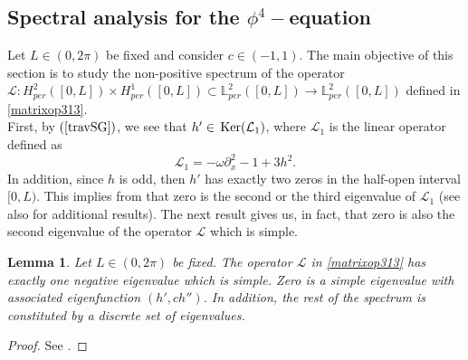 \documentclass[12pt,reqno,a4paper]{amsart} %
\newcommand{\Ker}{{\rm \,Ker}}
\numberwithin{equation}{section}
\numberwithin{figure}{section}
\newtheorem{lemma}[theorem]{Lemma}
\begin{document}
\subsection{Spectral analysis for the $\phi^4-$equation}\label{spectralKG} 

 Let $L\in (0,2\pi)$ be fixed and consider $c \in (-1,1)$. The main objective of this section is to study the non-positive spectrum of the  operator $\mathcal{L}:H^2_{per}([0,L])\times H^1_{per}([0,L]) \subset\mathbb{L}^2_{per}([0,L])\rightarrow \mathbb{L}^2_{per}([0,L])$ defined in \eqref{matrixop313}. \\
\indent First, by $(\ref{travSG})$, we see that $h' \in \Ker(\mathcal{L}_1)$, where $\mathcal{L}_1$ is the linear operator defined as
\begin{equation}\label{opL1}
\mathcal{L}_1=-\omega\partial_x^2-1+3h^2.
\end{equation}
In addition, since $h$ is odd, then $h'$ has exactly two zeros in the half-open interval $[0,L )$. This implies from \cite[Theorem 3.1.2]{eas} that zero is the second or the third eigenvalue of  $\mathcal{L}_1$ (see also \cite{magnus} for additional results). The next result gives us, in fact, that zero is also the second eigenvalue of the operator $\mathcal{L}$ which is simple.

\begin{lemma}\label{2eigenvalues}  Let $L\in (0,2\pi)$ be fixed.
The operator $\mathcal{L}$ in \eqref{matrixop313} has exactly one negative eigenvalue which is simple. Zero is a simple eigenvalue with associated eigenfunction $(h',ch'')$. In addition, the rest of the
spectrum is constituted by a discrete set of eigenvalues.
\end{lemma}
\begin{proof}
See \cite[Proposition 3.8]{loreno}.
\end{proof}
 
\end{document}
